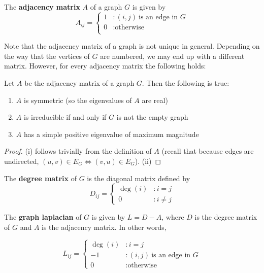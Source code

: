 \begin{definition}
  The \textbf{adjacency matrix} $A$ of a graph $G$ is given by
  \[
    A_{ij} = \begin{cases}
      1 &: (i,j) ~\text{is an edge in $G$} \\
      0 &: \text{otherwise} \\
    \end{cases}
  \]
\end{definition}


Note that the adjacency matrix of a graph is not unique in general. Depending on
the way that the vertices of $G$ are numbered, we may end up with a different
matrix. However, for every adjacency matrix the following holds:

\begin{remark}
  Let $A$ be the adjacency matrix of a graph $G$. Then the following is true:

  \begin{enumerate}
  \item $A$ is symmetric (so the eigenvalues of $A$ are real)
  \item $A$ is irreducible if and only if $G$ is not the empty graph
  \item $A$ has a simple positive eigenvalue of maximum magnitude
  \end{enumerate}
\end{remark}

\begin{proof}
  (i) follows trivially from the definition of $A$ (recall that because edges
  are undirected, $(u,v) \in E_G \iff (v,u) \in E_G$).
  (ii)
\end{proof}


\begin{definition}
  The \textbf{degree matrix} of $G$ is the diagonal matrix defined by
  \[
    D_{ij} = \begin{cases}
      \deg(i) &: i = j \\
      0 &: i \neq j
    \end{cases}
  \]
\end{definition}

\begin{definition}
  The \textbf{graph laplacian} of $G$ is given by $L = D - A$, where $D$ is the
  degree matrix of $G$ and $A$ is the adjacency matrix. In other words,

  \[
    L_{ij} = \begin{cases}
      \deg(i) &: i=j \\
      -1 &: (i,j) ~\text{is an edge in $G$} \\
      0 &: \text{otherwise}
    \end{cases}
  \]
\end{definition}

